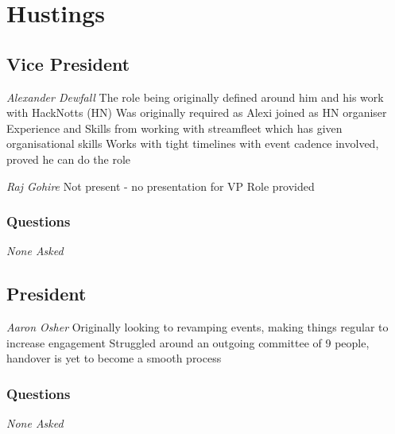 \documentclass[11pt]{meetingmins}
\begin{document}
\section{Hustings}
\subsection{Vice President}
\begin{items}
	\item
	\textit{Alexander Dewfall}
		\subitem
		The role being originally defined around him and his work with HackNotts (HN)
		\subitem
		Was originally required as Alexi joined as HN organiser
		\subitem
		Experience and Skills from working with streamfleet which has given organisational skills 
		\subitem
		Works with tight timelines with event cadence involved, proved he can do the role

	\item
	\textit{Raj Gohire}
		\subitem
		Not present - no presentation for VP Role provided
\end{items}

\subsubsection{Questions}
\textit{None Asked}

\subsection{President}
\begin{items}
	\item
	\textit{Aaron Osher}	
		\subitem
		Originally looking to revamping events, making things regular to increase engagement
		\subitem
		Struggled around an outgoing committee of 9 people, handover is yet to become a smooth process
\end{items}

\subsubsection{Questions}
\textit{None Asked}
\end{document}

